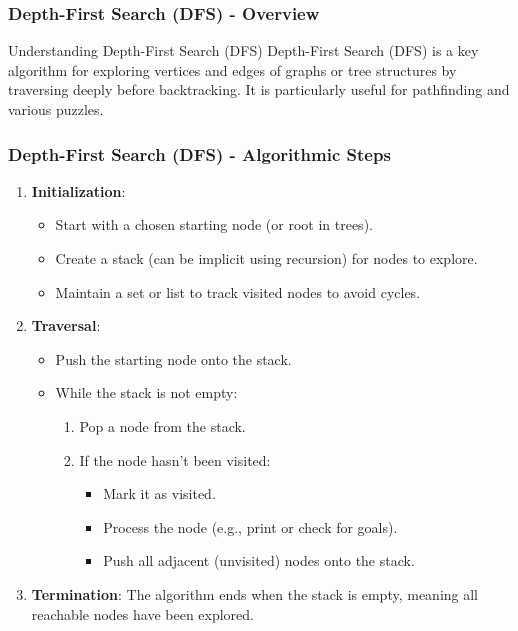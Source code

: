 \documentclass[aspectratio=169]{beamer}
\begin{document}
\begin{frame}[fragile]
    \frametitle{Depth-First Search (DFS) - Overview}
    \begin{block}{Understanding Depth-First Search (DFS)}
        Depth-First Search (DFS) is a key algorithm for exploring vertices and edges of graphs or tree structures by traversing deeply before backtracking. It is particularly useful for pathfinding and various puzzles.
    \end{block}
\end{frame}

\begin{frame}[fragile]
    \frametitle{Depth-First Search (DFS) - Algorithmic Steps}
    \begin{enumerate}
        \item \textbf{Initialization}:
        \begin{itemize}
            \item Start with a chosen starting node (or root in trees).
            \item Create a stack (can be implicit using recursion) for nodes to explore.
            \item Maintain a set or list to track visited nodes to avoid cycles.
        \end{itemize}
        
        \item \textbf{Traversal}:
        \begin{itemize}
            \item Push the starting node onto the stack.
            \item While the stack is not empty:
            \begin{enumerate}
                \item Pop a node from the stack.
                \item If the node hasn't been visited:
                \begin{itemize}
                    \item Mark it as visited.
                    \item Process the node (e.g., print or check for goals).
                    \item Push all adjacent (unvisited) nodes onto the stack.
                \end{itemize}
            \end{enumerate}
        \end{itemize}
        
        \item \textbf{Termination}: The algorithm ends when the stack is empty, meaning all reachable nodes have been explored.
    \end{enumerate}
\end{frame}
\end{document}
